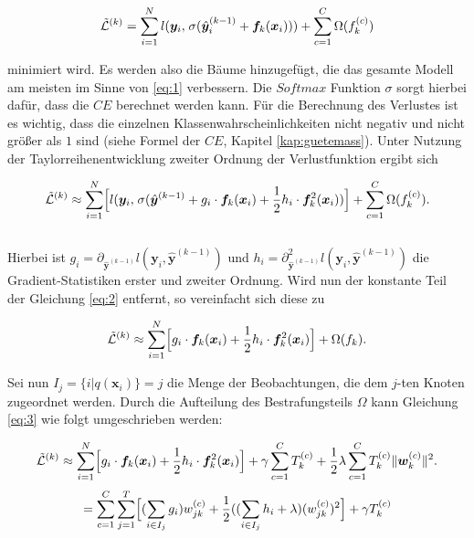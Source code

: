 \documentclass[a4paper,11pt]{article}
\begin{document}
\[\Tilde{\mathcal{L}}^{(k)} = \sum_{i = 1}^N l(\bm{y}_i,\hspace{0.04cm} \sigma (\hat{\bm{y}}_i^{(k-1)} + \bm{f}_k(\bm{x}_i))) + \sum_{c=1}^C \Omega(f_k^{(c)}) \]

minimiert wird. Es werden also die Bäume hinzugefügt, die das gesamte Modell am meisten im Sinne von \ref{eq:1} verbessern. Die $Softmax$ Funktion $\sigma$ sorgt hierbei dafür, dass die $CE$ berechnet werden kann. Für die Berechnung des Verlustes ist es wichtig, dass die einzelnen Klassenwahrscheinlichkeiten nicht negativ und nicht größer als $1$ sind (siehe Formel der $CE$, Kapitel \ref{kap:guetemass}). Unter Nutzung der Taylorreihenentwicklung zweiter Ordnung der Verlustfunktion ergibt sich 

\begin{equation}\label{eq:2}
     \Tilde{\mathcal{L}}^{(k)} \approx \sum_{i = 1}^N \Bigl[ l(\bm{y}_i,\hspace{0.04cm} \sigma(\hat{\bm{y}}^{(k-1)} + g_i \cdot \bm{f}_k(\bm{x}_i) + \frac{1}{2}h_i \cdot \bm{f}_k^2(\bm{x}_i)) \Bigr] + \sum_{c=1}^C \Omega(f_k^{(c)}). 
\end{equation}{}\\


Hierbei ist $g_i = \partial_{\hat{\bm{y}}^{(k-1)}} l(\bm{y}_i, \hat{\bm{y}}^{(k-1)})$  und $h_i = \partial_{\hat{\bm{y}}^{(k-1)}}^2 l(\bm{y}_i, \hat{\bm{y}}^{(k-1)})$ die Gradient-Statistiken erster und zweiter Ordnung. Wird nun der konstante Teil der Gleichung \ref{eq:2} entfernt, so vereinfacht sich diese zu

\begin{equation}\label{eq:3}
     \Tilde{\mathcal{L}}^{(k)} \approx \sum_{i = 1}^N \Bigl[g_i \cdot \bm{f}_k(\bm{x}_i) + \frac{1}{2}h_i \cdot \bm{f}_k^2(\bm{x}_i) \Bigr] + \Omega(f_k). 
\end{equation}{}

Sei nun $I_j = \{i|q(\bm{x}_i)\} = j$ die Menge der Beobachtungen, die dem $j$-ten Knoten zugeordnet werden. Durch die Aufteilung des Bestrafungsteils $\Omega$ kann Gleichung \ref{eq:3} wie folgt umgeschrieben werden:

\begin{equation}\label{eq:4}
     \Tilde{\mathcal{L}}^{(k)} \approx \sum_{i = 1}^N \Bigl[g_i \cdot \bm{f}_k(\bm{x}_i) + \frac{1}{2}h_i \cdot \bm{f}_k^2(\bm{x}_i) \Bigr] + \gamma \sum_{c=1}^C T_k^{(c)} + \frac{1}{2} \lambda \sum_{c=1}^C T_k^{(c)} \|\bm{w}_k^{(c)}\|^2. 
\end{equation}{}
\begin{equation*}
     =\sum_{c=1}^C  \sum_{j = 1}^T \Bigl[(\sum_{i \in I_j}g_i) w_{jk}^{(c)} + \frac{1}{2}((\sum_{i \in I_j} h_i + \lambda) (w_{jk}^{(c)})^2 \Bigr] + \gamma T_k^{(c)}
\end{equation*}{}
\end{document}
